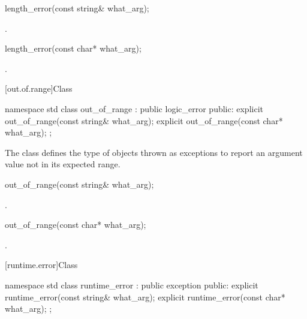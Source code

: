 %
\begin{itemdecl}
length_error(const string& what_arg);
\end{itemdecl}

\begin{itemdescr}
\pnum
\ensures
{}.
\end{itemdescr}

%
\begin{itemdecl}
length_error(const char* what_arg);
\end{itemdecl}

\begin{itemdescr}
\pnum
\ensures
{}.
\end{itemdescr}

[out.of.range]{Class }

%
\begin{codeblock}
namespace std {
  class out_of_range : public logic_error {
  public:
    explicit out_of_range(const string& what_arg);
    explicit out_of_range(const char* what_arg);
  };
}
\end{codeblock}

\pnum
The class
defines the type of objects thrown as exceptions to report an
argument value not in its expected range.

%
\begin{itemdecl}
out_of_range(const string& what_arg);
\end{itemdecl}

\begin{itemdescr}
\pnum
\ensures
{}.
\end{itemdescr}

%
\begin{itemdecl}
out_of_range(const char* what_arg);
\end{itemdecl}

\begin{itemdescr}
\pnum
\ensures
{}.
\end{itemdescr}

[runtime.error]{Class }

%
\begin{codeblock}
namespace std {
  class runtime_error : public exception {
  public:
    explicit runtime_error(const string& what_arg);
    explicit runtime_error(const char* what_arg);
  };
}
\end{codeblock}

